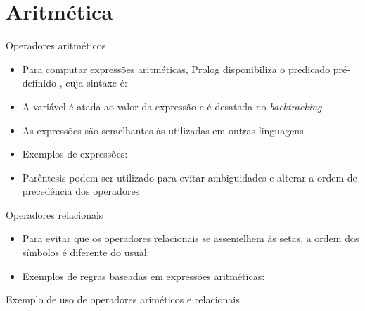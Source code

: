 \section{Aritmética}

\begin{frame}[fragile]{Operadores aritméticos}

    \begin{itemize}
        \item Para computar expressões aritméticas, Prolog disponibiliza o predicado 
            pré-definido , cuja sintaxe é:


        \item A variável  é atada ao valor da expressão e é desatada no 
            \textit{backtracking}

        \item As expressões são semelhantes às utilizadas em outras linguagens

        \item Exemplos de expressões:


        \item Parêntesis podem ser utilizado para evitar ambiguidades e alterar a ordem de 
            precedência dos operadores


    \end{itemize}

\end{frame}

\begin{frame}[fragile]{Operadores relacionais}

    \begin{itemize}
        \item Para evitar que os operadores relacionais se assemelhem às setas, a ordem dos 
            símbolos é diferente do usual:


        \item Exemplos de regras baseadas em expressões aritméticas:


    \end{itemize}

\end{frame}

\begin{frame}[fragile]{Exemplo de uso de operadores ariméticos e relacionais}


\end{frame}
